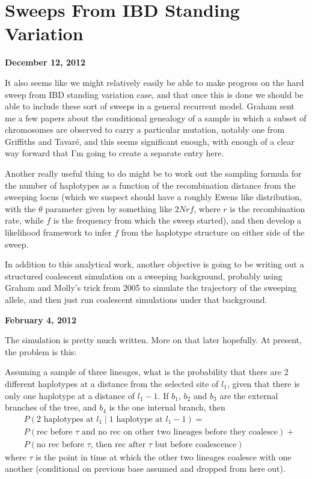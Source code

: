\documentclass[reqno]{amsart}
\begin{document}
\section*{Sweeps From IBD Standing Variation} 
\begin{flushright}
	\textbf{December 12, 2012}
\end{flushright}

It also seems like we might relatively easily be able to make progress on the hard sweep from IBD standing variation case, and that once this is done we should be able to include these sort of sweeps in a general recurrent model. Graham sent me a few papers about the conditional genealogy of a sample in which a subset of chromosomes are observed to carry a particular mutation, notably one from Griffiths and Tavar{\'e}\cite{GriffithsTavare:2003}, and this seems significant enough, with enough of a clear way forward that I'm going to create a separate entry here.

Another really useful thing to do might be to work out the sampling formula for the number of haplotypes as a function of the recombination distance from the sweeping locus (which we suspect should have a roughly Ewens like distribution, with the $\theta$ parameter given by something like $2Nrf$, where $r$ is the recombination rate, while $f$ is the frequency from which the sweep started), and then develop a likelihood framework to infer $f$ from the haplotype structure on either side of the sweep.

In addition to this analytical work, another objective is going to be writing out a structured coalescent simulation on a sweeping background, probably using Graham and Molly's trick from 2005\cite{Przeworski2005} to simulate the trajectory of the sweeping allele, and then just run coalescent simulations under that background.

\begin{flushright}
	\textbf{February 4, 2012}
\end{flushright}

The simulation is pretty much written. More on that later hopefully. At present, the problem is this: 

Assuming a sample of three lineages, what is the probability that there are 2 different haplotypes at a distance from the selected site of $l_1$, given that there is only one haplotype at a distance of $l_1-1$. If $b_1$, $b_2$ and $b_3$ are the external branches of the tree, and $b_4$ is the one internal branch, then
\begin{align}
	& P(\text{2 haplotypes at } l_1 \mid  \text{1 haplotype at } l_1-1) = \\
	& P(\text{rec before } \tau \text{ and no rec on other two lineages before they coalesce}) + \\
	& P(\text{no rec before }\tau \text{, then rec after } \tau \text{ but before coalescence})
\end{align}
where $\tau$ is the point in time at which the other two lineages coalesce with one another (conditional on previous base assumed and dropped from here out).
\end{document}
